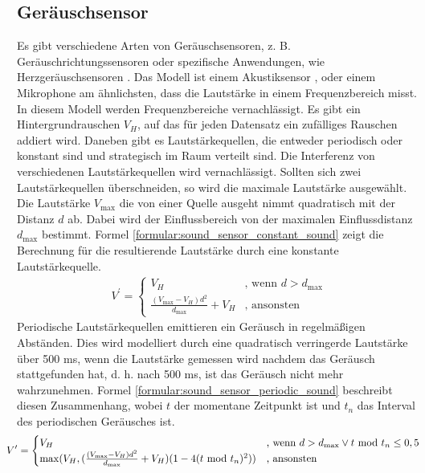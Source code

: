 \subsection{Geräuschsensor}
Es gibt verschiedene Arten von Geräuschsensoren, z. B. Geräuschrichtungssensoren \cite{tiete2014soundcompass} oder
spezifische Anwendungen, wie Herzgeräuschsensoren \cite{zhang2016design}.
Das Modell ist einem Akustiksensor \cite{sessler1991acoustic}, oder einem Mikrophone am ähnlichsten,
dass die Lautstärke in einem Frequenzbereich misst.
\newline
\newline
In diesem Modell werden Frequenzbereiche vernachlässigt.
Es gibt ein Hintergrundrauschen $V_H$, auf das für jeden Datensatz ein zufälliges Rauschen addiert wird.
Daneben gibt es Lautstärkequellen, die entweder periodisch oder konstant sind und strategisch im Raum verteilt sind.
Die Interferenz von verschiedenen Lautstärkequellen wird vernachlässigt.
Sollten sich zwei Lautstärkequellen überschneiden, so wird die maximale Lautstärke ausgewählt.
\newline
\newline
Die Lautstärke $V_{\max}$ die von einer Quelle ausgeht nimmt quadratisch mit der Distanz $d$ ab.
Dabei wird der Einflussbereich von der maximalen Einflussdistanz $d_{\max}$ bestimmt.
Formel \ref{formular:sound_sensor_constant_sound} zeigt die Berechnung für die resultierende Lautstärke durch eine konstante Lautstärkequelle.
\begin{align}
    \label{formular:sound_sensor_constant_sound}
    V^{\prime} = \begin{cases}
                     V_H & \text{, wenn } d > d_{\max} \\
                     \frac{(V_{\max} - V_H)d^2}{d_{\max}} + V_H & \text{, ansonsten}
    \end{cases}
\end{align}
\newpage
Periodische Lautstärkequellen emittieren ein Geräusch in regelmäßigen Abständen.
Dies wird modelliert durch eine quadratisch verringerde Lautstärke über 500 ms,
wenn die Lautstärke gemessen wird nachdem das Geräusch stattgefunden hat,
d. h. nach 500 ms, ist das Geräusch nicht mehr wahrzunehmen.
Formel \ref{formular:sound_sensor_periodic_sound} beschreibt diesen Zusammenhang,
wobei $t$ der momentane Zeitpunkt ist und $t_{n}$ das Interval des periodischen Geräusches ist.
\begin{align}
    \label{formular:sound_sensor_periodic_sound}
    \hspace{-0.4cm}
    V^{\prime} = \begin{cases}
                     V_H & \text{, wenn } d > d_{\max} \vee t\ \text{mod}\ t_{n}\leq 0,5 \\
                     \max(V_H, (\frac{(V_{\max} - V_H)d^2}{d_{\max}} + V_H)(1 - 4(t\ \text{mod}\ t_{n})^2)) & \text{, ansonsten}
    \end{cases}
\end{align}

